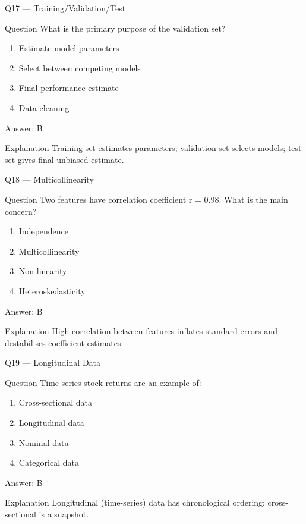 \documentclass[aspectratio=169,8pt]{beamer}
\begin{document}
	\begin{frame}{Q17 --- Training/Validation/Test}
		\begin{block}{Question}
			What is the primary purpose of the validation set?
		\end{block}
		\begin{enumerate}
			\item Estimate model parameters
			\item Select between competing models
			\item Final performance estimate
			\item Data cleaning
		\end{enumerate}
		\begin{exampleblock}{Answer: B}\end{exampleblock}
		\begin{block}{Explanation}
			Training set estimates parameters; validation set selects models; test set gives final unbiased estimate.
		\end{block}
	\end{frame}
	
	\begin{frame}{Q18 --- Multicollinearity}
		\begin{block}{Question}
			Two features have correlation coefficient r = 0.98. What is the main concern?
		\end{block}
		\begin{enumerate}
			\item Independence
			\item Multicollinearity
			\item Non-linearity
			\item Heteroskedasticity
		\end{enumerate}
		\begin{exampleblock}{Answer: B}\end{exampleblock}
		\begin{block}{Explanation}
			High correlation between features inflates standard errors and destabilises coefficient estimates.
		\end{block}
	\end{frame}
	
	\begin{frame}{Q19 --- Longitudinal Data}
		\begin{block}{Question}
			Time-series stock returns are an example of:
		\end{block}
		\begin{enumerate}
			\item Cross-sectional data
			\item Longitudinal data
			\item Nominal data
			\item Categorical data
		\end{enumerate}
		\begin{exampleblock}{Answer: B}\end{exampleblock}
		\begin{block}{Explanation}
			Longitudinal (time-series) data has chronological ordering; cross-sectional is a snapshot.
		\end{block}
	\end{frame}
	
\end{document}
